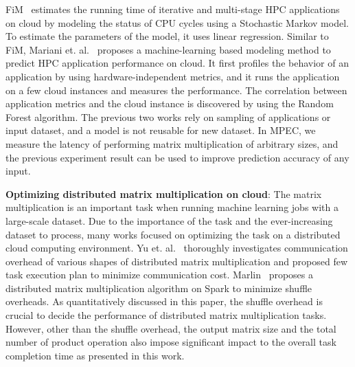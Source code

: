 \documentclass[10pt, conference, compsocconf]{IEEEtran}
\begin{document}
FiM~\cite{fim} estimates the running time of iterative and multi-stage HPC applications on cloud by modeling the status of CPU cycles using a Stochastic Markov model. To estimate the parameters of the model, it uses linear regression. Similar to FiM, Mariani et. al.~\cite{hpc-cloud-predict} proposes a machine-learning based modeling method to predict HPC application performance on cloud. It first profiles the behavior of an application by using hardware-independent metrics, and it runs the application on a few cloud instances and measures the performance. The correlation between application metrics and the cloud instance is discovered by using the Random Forest algorithm. The previous two works rely on sampling of applications or input dataset, and a model is not reusable for new dataset. In MPEC, we measure the latency of performing matrix multiplication of arbitrary sizes, and the previous experiment result can be used to improve prediction accuracy of any input.

\textbf{Optimizing distributed matrix multiplication on cloud}: The matrix multiplication is an important task when running machine learning jobs with a large-scale dataset. Due to the importance of the task and the ever-increasing dataset to process, many works focused on optimizing the task on a distributed cloud computing environment. Yu et. al.~\cite{matmult-overhead-profiling} thoroughly investigates communication overhead of various shapes of distributed matrix multiplication and proposed few task execution plan to minimize communication cost. Marlin~\cite{marlin} proposes a distributed matrix multiplication algorithm on Spark to minimize shuffle overheads. As quantitatively discussed in this paper, the shuffle overhead is crucial to decide the performance of distributed matrix multiplication tasks. However, other than the shuffle overhead, the output matrix size and the total number of product operation also impose significant impact to the overall task completion time as presented in this work.
\end{document}
